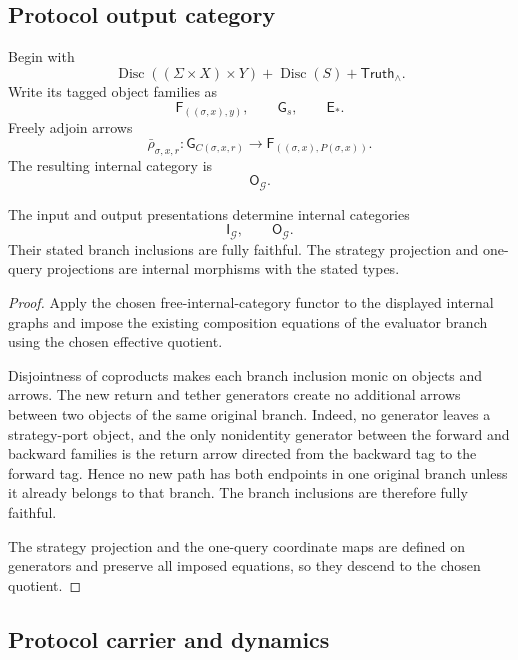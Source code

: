 \subsection{Protocol output category}

Begin with
\[
  \operatorname{Disc}((\Sigma\times X)\times Y)
  +
  \operatorname{Disc}(S)
  +
  \mathsf{Truth}_\wedge.
\]
Write its tagged object families as
\[
  \mathsf F_{((\sigma,x),y)},
  \qquad
  \mathsf G_s,
  \qquad
  \mathsf E_*.
\]
Freely adjoin arrows
\[
  \bar\rho_{\sigma,x,r}:
  \mathsf G_{C(\sigma,x,r)}
  \longrightarrow
  \mathsf F_{((\sigma,x),P(\sigma,x))}.
\]
The resulting internal category is
\[
  \mathsf O_{\mathcal G}.
\]

\begin{proposition}
\label{prop:canonical-protocol-signature-exists}
The input and output presentations determine internal categories
\[
  \mathsf I_{\mathcal G},
  \qquad
  \mathsf O_{\mathcal G}.
\]
Their stated branch inclusions are fully faithful. The strategy projection and one-query projections
are internal morphisms with the stated types.
\end{proposition}

\begin{proof}
Apply the chosen free-internal-category functor to the displayed internal graphs and impose the
existing composition equations of the evaluator branch using the chosen effective quotient.

Disjointness of coproducts makes each branch inclusion monic on objects and arrows. The new return
and tether generators create no additional arrows between two objects of the same original branch.
Indeed, no generator leaves a strategy-port object, and the only nonidentity generator between the
forward and backward families is the return arrow directed from the backward tag to the forward tag.
Hence no new path has both endpoints in one original branch unless it already belongs to that
branch. The branch inclusions are therefore fully faithful.

The strategy projection and the one-query coordinate maps are defined on generators and preserve
all imposed equations, so they descend to the chosen quotient.
\end{proof}

\subsection{Protocol carrier and dynamics}

